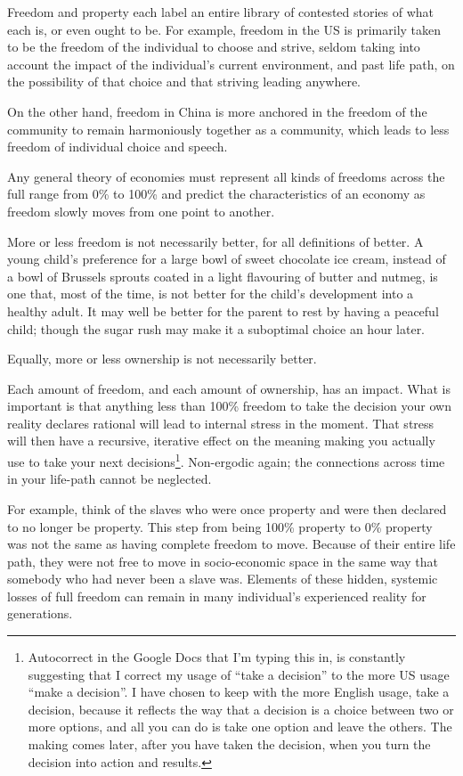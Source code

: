 Freedom and property each label an entire library of contested stories of what each is, or even ought to be. For example, freedom in the US is primarily taken to be the freedom of the individual to choose and strive, seldom taking into account the impact of the individual's current environment, and past life path, on the possibility of that choice and that striving leading anywhere.


On the other hand, freedom in China is more anchored in the freedom of the community to remain harmoniously together as a community, which leads to less freedom of individual choice and speech.


Any general theory of economies  must represent all kinds of freedoms across the full range from 0\% to 100\% and predict the characteristics of an economy as freedom slowly moves from one point to another.


More or less freedom is not necessarily better, for all definitions of better. A young child's preference for a large bowl of sweet chocolate ice cream, instead of a bowl of Brussels sprouts coated in a light flavouring of butter and nutmeg, is one that, most of the time, is not better for the child's development into a healthy adult. It may well be better for the parent to rest by having a peaceful child; though the sugar rush may make it a suboptimal choice an hour later.


Equally, more or less ownership is not necessarily better.


Each amount of freedom, and each amount of ownership, has an impact. What is important is that anything less than 100\% freedom to take the decision your own reality declares rational will lead to internal stress in the moment. That stress will then have a recursive, iterative effect on the meaning making you actually use to take your next decisions\footnote{Autocorrect in the Google Docs that I'm typing this in, is constantly suggesting that I correct my usage of “take a decision” to the more US usage “make a decision”. I have chosen to keep with the more English usage, take a decision, because it reflects the way that a decision is a choice between two or more options, and all you can do is take one option and leave the others. The making comes later, after you have taken the decision, when you turn the decision into action and results.}. Non-ergodic again; the connections across time in your life-path cannot be neglected.


For example, think of the slaves who were once property and were then declared to no longer be property. This step from being 100\% property to 0\% property was not the same as having complete freedom to move. Because of their entire life path, they were not free to move in socio-economic space in the same way that somebody who had never been a slave was. Elements of these hidden, systemic losses of full freedom can remain in many individual’s experienced reality for generations.


